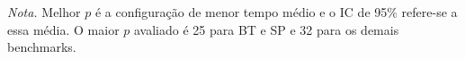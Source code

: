 \documentclass[a4paper,11pt]{article}
\begin{document}
\begin{table}[!ht]
  \centering
  \setlength{\belowcaptionskip}{5pt}
  \caption{Síntese do desempenho por benchmark.}
  \label{tab:sintese-desempenho}
  
  \par\smallskip
  {\footnotesize\raggedright
    \textit{Nota.} Melhor $p$ é a configuração de menor tempo médio e o IC de 95\% refere-se a essa média. O maior $p$ avaliado é 25 para BT e SP e 32 para os demais benchmarks.\par}
\end{table}
\end{document}

